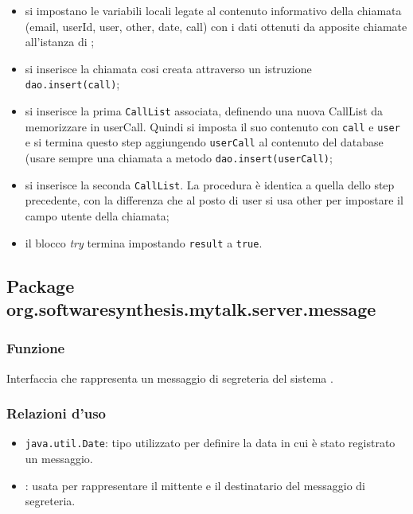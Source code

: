 \begin{description}
\begin{itemize}
	\item si impostano le variabili locali legate al contenuto informativo della chiamata (email, userId, user, other, date, call) con i dati ottenuti da apposite chiamate all'istanza di ;
	\item si inserisce la chiamata cosi creata attraverso un istruzione \texttt{dao.insert(call)};
	\item si inserisce la prima \texttt{CallList} associata, definendo una nuova CallList da memorizzare in userCall. Quindi si imposta il suo contenuto con \texttt{call} e \texttt{user} e si termina questo step aggiungendo \texttt{userCall} al contenuto del database (usare sempre una chiamata a metodo \texttt{dao.insert(userCall)};
	\item si inserisce la seconda \texttt{CallList}. La procedura è identica a quella dello step precedente, con la differenza che  al posto di user si usa other per impostare il campo utente della chiamata;
	\item il blocco \textit{try} termina impostando \texttt{result} a \texttt{true}.
\end{itemize}

\end{description}

\subsection{Package org.softwaresynthesis.mytalk.server.message}\label{sec:message}


\subsubsection*{Funzione}
Interfaccia che rappresenta un messaggio di segreteria del sistema \caName.

\subsubsection*{Relazioni d'uso}
\begin{itemize}
	\item \texttt{java.util.Date}: tipo utilizzato per definire la data in cui è stato registrato un messaggio.
	\item {}: usata per rappresentare il mittente e il destinatario del messaggio di segreteria.
\end{itemize}


